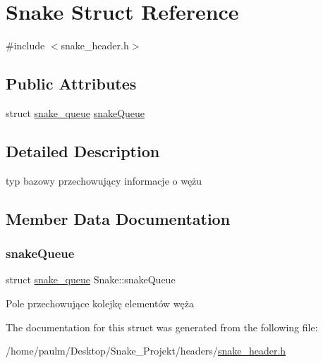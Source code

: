 \hypertarget{structSnake}{}\section{Snake Struct Reference}
\label{structSnake}


{\ttfamily \#include $<$snake\+\_\+header.\+h$>$}

\subsection*{Public Attributes}
\begin{DoxyCompactItemize}
\item 
struct \mbox{\hyperlink{structsnake__queue}{snake\+\_\+queue}} \mbox{\hyperlink{structSnake_a3bc10a69c204fc4b901b6e18a49ebb7a}{snake\+Queue}}
\end{DoxyCompactItemize}


\subsection{Detailed Description}
typ bazowy przechowujący informacje o wężu 

\subsection{Member Data Documentation}
\mbox{\label{structSnake_a3bc10a69c204fc4b901b6e18a49ebb7a}} 
\subsubsection{\texorpdfstring{snakeQueue}{snakeQueue}}
{\footnotesize\ttfamily struct \mbox{\hyperlink{structsnake__queue}{snake\+\_\+queue}} Snake\+::snake\+Queue}

Pole przechowujące kolejkę elementów węża 

The documentation for this struct was generated from the following file\+:\begin{DoxyCompactItemize}
\item 
/home/paulm/\+Desktop/\+Snake\+\_\+\+Projekt/headers/\mbox{\hyperlink{snake__header_8h}{snake\+\_\+header.\+h}}\end{DoxyCompactItemize}

